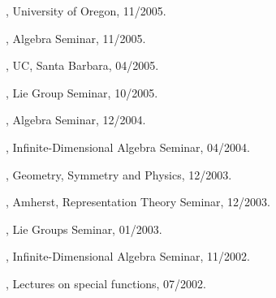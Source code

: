 \documentclass[11pt]{amsart}
\theoremstyle{plain}
\theoremstyle{definition}
\theoremstyle{remark}
\begin{document}
, University of Oregon,
11/2005.



, Algebra Seminar,
11/2005.

, UC, Santa Barbara, 04/2005.

, Lie Group Seminar, 10/2005.

, Algebra Seminar, 12/2004.


, Infinite-Dimensional Algebra Seminar, 04/2004.

, Geometry, Symmetry and Physics,
12/2003.

, Amherst,
Representation Theory
          Seminar, 12/2003.

, Lie Groups Seminar, 01/2003.



, Infinite-Dimensional Algebra Seminar,
11/2002.

, Lectures on special
functions, 07/2002.

\medskip

\newpage
\end{document}
